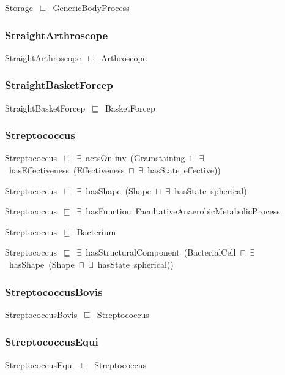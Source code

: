 \documentclass{article}
\begin{document}
Storage~\ensuremath{\sqsubseteq}~GenericBodyProcess~

\subsubsection*{StraightArthroscope}

StraightArthroscope~\ensuremath{\sqsubseteq}~Arthroscope~

\subsubsection*{StraightBasketForcep}

StraightBasketForcep~\ensuremath{\sqsubseteq}~BasketForcep~

\subsubsection*{Streptococcus}

Streptococcus~\ensuremath{\sqsubseteq}~\ensuremath{\exists}~actsOn-inv~(Gramstaining~\ensuremath{\sqcap}~\ensuremath{\exists}~hasEffectiveness~(Effectiveness~\ensuremath{\sqcap}~\ensuremath{\exists}~hasState~effective))~

Streptococcus~\ensuremath{\sqsubseteq}~\ensuremath{\exists}~hasShape~(Shape~\ensuremath{\sqcap}~\ensuremath{\exists}~hasState~spherical)~

Streptococcus~\ensuremath{\sqsubseteq}~\ensuremath{\exists}~hasFunction~FacultativeAnaerobicMetabolicProcess~

Streptococcus~\ensuremath{\sqsubseteq}~Bacterium~

Streptococcus~\ensuremath{\sqsubseteq}~\ensuremath{\exists}~hasStructuralComponent~(BacterialCell~\ensuremath{\sqcap}~\ensuremath{\exists}~hasShape~(Shape~\ensuremath{\sqcap}~\ensuremath{\exists}~hasState~spherical))~

\subsubsection*{StreptococcusBovis}

StreptococcusBovis~\ensuremath{\sqsubseteq}~Streptococcus~

\subsubsection*{StreptococcusEqui}

StreptococcusEqui~\ensuremath{\sqsubseteq}~Streptococcus~
\end{document}
